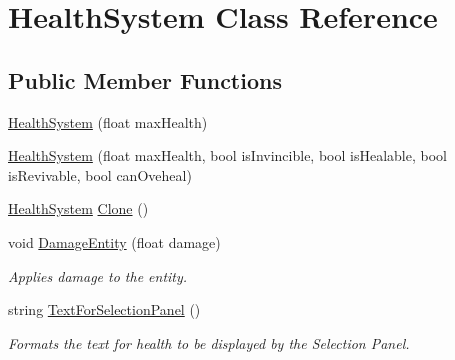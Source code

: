\hypertarget{class_health_system}{}\section{Health\+System Class Reference}
\label{class_health_system}
\subsection*{Public Member Functions}
\begin{DoxyCompactItemize}
\item 
\hyperlink{class_health_system_a259eb4ec7b1886fd490ccd97e8d14929}{Health\+System} (float max\+Health)
\item 
\hyperlink{class_health_system_a632e30e7613cc00bd282819619199599}{Health\+System} (float max\+Health, bool is\+Invincible, bool is\+Healable, bool is\+Revivable, bool can\+Oveheal)
\item 
\hyperlink{class_health_system}{Health\+System} \hyperlink{class_health_system_a0f6e79635da6cf8a3a9493fc422f3fcb}{Clone} ()
\item 
void \hyperlink{class_health_system_a5b63bccbb8a3da90a8e87f75e904e572}{Damage\+Entity} (float damage)
\begin{DoxyCompactList}\small\item\em Applies damage to the entity. \end{DoxyCompactList}\item 
string \hyperlink{class_health_system_ab25c1f3f05672c28f452afa2d0125e97}{Text\+For\+Selection\+Panel} ()
\begin{DoxyCompactList}\small\item\em Formats the text for health to be displayed by the Selection Panel. \end{DoxyCompactList}\end{DoxyCompactItemize}
